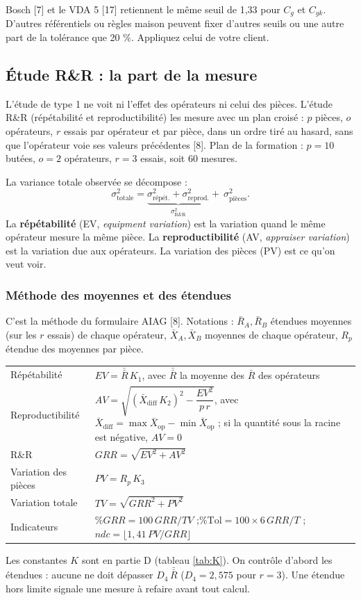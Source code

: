 \documentclass[11pt,a4paper]{article}
\newcommand{\Rb}{\bar{R}}
\begin{document}
\begin{note}
Bosch [7] et le VDA 5 [17] retiennent le même seuil de 1,33 pour $C_g$ et $C_{gk}$. D'autres référentiels ou règles maison peuvent fixer d'autres seuils ou une autre part de la tolérance que 20 \%. Appliquez celui de votre client.
\end{note}

\subsection{Étude R\&R : la part de la mesure}\label{sec:rr}
L'étude de type 1 ne voit ni l'effet des opérateurs ni celui des pièces. L'étude R\&R (répétabilité et reproductibilité) les mesure avec un plan croisé : $p$ pièces, $o$ opérateurs, $r$ essais par opérateur et par pièce, dans un ordre tiré au hasard, sans que l'opérateur voie ses valeurs précédentes [8]. Plan de la formation : $p=10$ butées, $o=2$ opérateurs, $r=3$ essais, soit 60 mesures.

La variance totale observée se décompose :
\[
\sigma^2_{\text{totale}}=\underbrace{\sigma^2_{\text{répét.}}+\sigma^2_{\text{reprod.}}}_{\sigma^2_{\text{R\&R}}}+\ \sigma^2_{\text{pièces}} .
\]
La \textbf{répétabilité} (EV, \emph{equipment variation}) est la variation quand le même opérateur mesure la même pièce. La \textbf{reproductibilité} (AV, \emph{appraiser variation}) est la variation due aux opérateurs. La variation des pièces (PV) est ce qu'on veut voir.

\subsubsection{Méthode des moyennes et des étendues}
C'est la méthode du formulaire AIAG [8]. Notations : $\Rb_A,\Rb_B$ étendues moyennes (sur les $r$ essais) de chaque opérateur, $\bar X_A,\bar X_B$ moyennes de chaque opérateur, $R_p$ étendue des moyennes par pièce.
\begin{center}\small
\renewcommand{\arraystretch}{1.6}
\begin{tabularx}{\textwidth}{@{}lX@{}}\toprule
Répétabilité & $EV=\bar{\bar R}\,K_1$, avec $\bar{\bar R}$ la moyenne des $\Rb$ des opérateurs\\
Reproductibilité & $AV=\sqrt{(\bar X_{\text{diff}}\,K_2)^2-\dfrac{EV^2}{p\,r}}$, avec $\bar X_{\text{diff}}=\max\bar X_{\text{op}}-\min\bar X_{\text{op}}$ ; si la quantité sous la racine est négative, $AV=0$\\
R\&R & $GRR=\sqrt{EV^2+AV^2}$\\
Variation des pièces & $PV=R_p\,K_3$\\
Variation totale & $TV=\sqrt{GRR^2+PV^2}$\\
Indicateurs & $\%GRR=100\,GRR/TV$ ;\quad $\%\text{Tol}=100\times6\,GRR/T$ ;\quad $ndc=\lfloor1{,}41\,PV/GRR\rfloor$\\\bottomrule
\end{tabularx}
\end{center}
Les constantes $K$ sont en partie D (tableau \ref{tab:K}). On contrôle d'abord les étendues : aucune ne doit dépasser $D_4\,\bar{\bar R}$ ($D_4=2{,}575$ pour $r=3$). Une étendue hors limite signale une mesure à refaire avant tout calcul.
\end{document}
